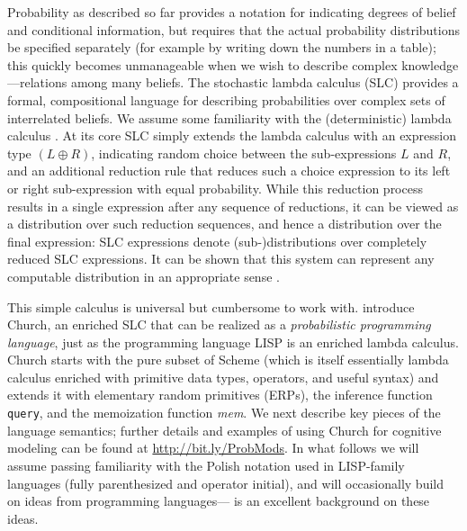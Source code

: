 \documentclass[pdfextras]{handbook}
\begin{document}
Probability as described so far provides a notation for indicating degrees of belief and conditional information, but requires that the actual probability distributions be specified separately (for example by writing down the numbers in a table); this quickly becomes unmanageable when we wish to describe complex knowledge---relations among many beliefs. 
The stochastic lambda calculus (SLC) provides a formal, compositional language for describing probabilities over complex sets of interrelated beliefs. 
We assume some familiarity with the (deterministic) lambda calculus \cite{lambda}. 
At its core SLC simply extends the lambda calculus with an expression type $(L \oplus R)$, indicating random choice between the sub-expressions $L$ and $R$, and an additional reduction rule that reduces such a choice expression to its left or right sub-expression with equal probability. 
While this reduction process results in a single expression after any sequence of reductions, it can be viewed as a distribution over such reduction sequences, and hence a distribution over the final expression: SLC expressions denote (sub-)distributions over completely reduced SLC expressions. 
It can be shown that this system can represent any computable distribution in an appropriate sense \cite[see for example][]{PfefferRamsey,FreeRoy}.

This simple calculus is universal but cumbersome to work with. 
\citet{Goodman2008} introduce Church, an enriched SLC that can be realized as a \emph{probabilistic programming language}, just as the programming language LISP is an enriched lambda calculus. 
Church starts with the pure subset of Scheme (which is itself essentially lambda calculus enriched with primitive data types, operators, and useful syntax) and extends it with elementary random primitives (ERPs), the inference function \lstinline{query}, and the memoization function \emph{mem}. 
We next describe key pieces of the language semantics; further details and examples of using Church for cognitive modeling can be found at \url{http://bit.ly/ProbMods}.
In what follows we will assume passing familiarity with the Polish notation used in LISP-family languages (fully parenthesized and operator initial), and will occasionally build on ideas from programming languages---\cite{SICP} is an excellent background on these ideas. 
\end{document}
